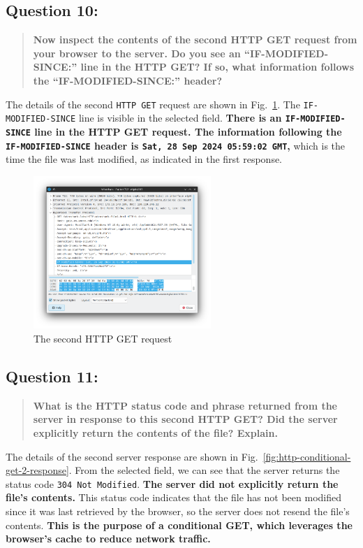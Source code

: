 \documentclass{cshwk}
\begin{document}
\subsection*{Question 10:}
\begin{quote}
    \textbf{Now inspect the contents of the second HTTP GET request from your browser to the server. Do you see an “IF-MODIFIED-SINCE:” line in the HTTP GET? If so, what information follows the “IF-MODIFIED-SINCE:” header?}
\end{quote}

The details of the second \texttt{HTTP GET} request are shown in Fig.~\ref{fig:http-conditional-get-2}. The \texttt{IF-MODIFIED-SINCE} line is visible in the selected field. \textbf{There is an \texttt{IF-MODIFIED-SINCE} line in the HTTP GET request. The information following the \texttt{IF-MODIFIED-SINCE} header is \texttt{Sat, 28 Sep 2024 05:59:02 GMT},} which is the time the file was last modified, as indicated in the first response.


\begin{figure}[htbp]
    \centering
    \includegraphics[width=0.6\textwidth]{lab2-7.png}
    \caption{The second HTTP GET request}
    \label{fig:http-conditional-get-2}
\end{figure}

\subsection*{Question 11:}
\begin{quote}
    \textbf{What is the HTTP status code and phrase returned from the server in response to this second HTTP GET? Did the server explicitly return the contents of the file? Explain.}
\end{quote}

The details of the second server response are shown in Fig.~\ref{fig:http-conditional-get-2-response}. From the selected field, we can see that the server returns the status code \texttt{304 Not Modified}. \textbf{The server did not explicitly return the file's contents.} This status code indicates that the file has not been modified since it was last retrieved by the browser, so the server does not resend the file's contents. \textbf{This is the purpose of a conditional GET, which leverages the browser's cache to reduce network traffic.}
\end{document}
